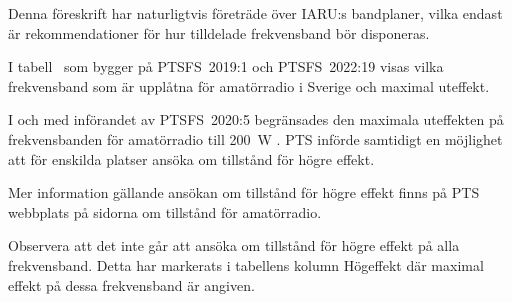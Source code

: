 Denna föreskrift har naturligtvis företräde över IARU:s bandplaner, vilka
endast är rekommendationer för hur tilldelade frekvensband bör disponeras.

I tabell~ som bygger på PTSFS~2019:1 och PTSFS~2022:19
visas vilka frekvensband som är upplåtna för amatörradio i Sverige och maximal
uteffekt.

I och med införandet av PTSFS~2020:5 begränsades den maximala uteffekten på
frekvensbanden för amatörradio till \qty{200}{\watt} \pep.
PTS införde samtidigt en möjlighet att för enskilda platser ansöka om tillstånd
för högre effekt.

Mer information gällande ansökan om tillstånd för högre effekt finns på PTS
webbplats på sidorna om tillstånd för amatörradio.

Observera att det inte går att ansöka om tillstånd för högre effekt på alla
frekvensband.
Detta har markerats i tabellens kolumn Högeffekt där maximal effekt på dessa
frekvensband är angiven.


